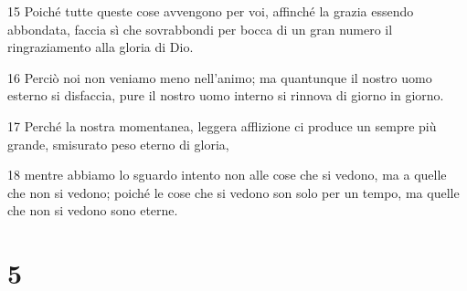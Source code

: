 \par 15 Poiché tutte queste cose avvengono per voi, affinché la grazia essendo abbondata, faccia sì che sovrabbondi per bocca di un gran numero il ringraziamento alla gloria di Dio.
\par 16 Perciò noi non veniamo meno nell'animo; ma quantunque il nostro uomo esterno si disfaccia, pure il nostro uomo interno si rinnova di giorno in giorno.
\par 17 Perché la nostra momentanea, leggera afflizione ci produce un sempre più grande, smisurato peso eterno di gloria,
\par 18 mentre abbiamo lo sguardo intento non alle cose che si vedono, ma a quelle che non si vedono; poiché le cose che si vedono son solo per un tempo, ma quelle che non si vedono sono eterne.

\chapter{5}


